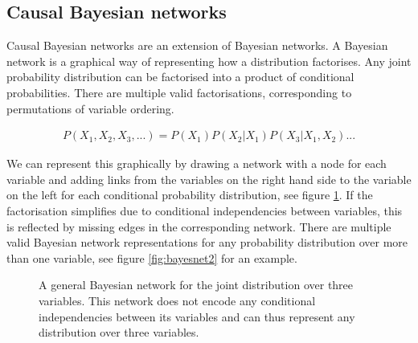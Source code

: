 \documentclass[11pt,a4paper,oneside]{book}
\newcommand{\eqn}[1]{\begin{align}#1\end{align}}
\theoremstyle{plain}
\theoremstyle{definition}
\begin{document}
\subsection{Causal Bayesian networks}

Causal Bayesian networks are an extension of Bayesian networks. A Bayesian network is a graphical way of representing how a distribution factorises. Any joint probability distribution can be factorised into a product of conditional probabilities. There are multiple valid factorisations, corresponding to permutations of variable ordering.

\eqn{
\label{eqn:cbn:joint_dist}
P(X_{1},X_{2},X_{3},...)=P(X_{1})P(X_{2}|X_{1})P(X_{3}|X_{1},X_{2})...
}

We can represent this graphically by drawing a network with a node for each variable and adding links from the variables on the right hand side to the variable on the left for each conditional probability distribution, see figure \ref{fig:bayesnet}. If the factorisation simplifies due to conditional independencies between variables, this is reflected by missing edges in the corresponding network. There are multiple valid Bayesian network representations for any probability distribution over more than one variable, see figure \ref{fig:bayesnet2} for an example. 

\begin{figure}[h]
\centering
{}
\caption{A general Bayesian network for the joint distribution over three variables. This network does not encode any conditional independencies between its variables and can thus represent any distribution over three variables.}
\label{fig:bayesnet}
\end{figure}
\end{document}
